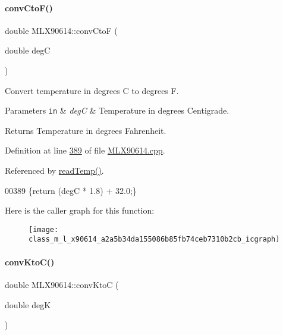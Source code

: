 \paragraph{\texorpdfstring{conv\+Cto\+F()}{convCtoF()}}
{\footnotesize\ttfamily double M\+L\+X90614\+::conv\+CtoF (\begin{DoxyParamCaption}\item[{double}]{degC }\end{DoxyParamCaption})}



Convert temperature in degrees C to degrees F. 


\begin{DoxyParams}[1]{Parameters}
\mbox{\tt in}  & {\em degC} & Temperature in degrees Centigrade. \\
\hline
\end{DoxyParams}
\begin{DoxyReturn}{Returns}
Temperature in degrees Fahrenheit. 
\end{DoxyReturn}


Definition at line \mbox{\hyperlink{_m_l_x90614_8cpp_source_l00389}{389}} of file \mbox{\hyperlink{_m_l_x90614_8cpp_source}{M\+L\+X90614.\+cpp}}.



Referenced by \mbox{\hyperlink{_m_l_x90614_8cpp_source_l00084}{read\+Temp()}}.


\begin{DoxyCode}
00389 \{\textcolor{keywordflow}{return} (degC * 1.8) + 32.0;\}
\end{DoxyCode}
Here is the caller graph for this function\+:\nopagebreak
\begin{figure}[H]
\begin{center}
\leavevmode
\texttt{[image: class\_m\_l\_x90614\_a2a5b34da155086b85fb74ceb7310b2cb\_icgraph]}
\end{center}
\end{figure}
\mbox{\label{class_m_l_x90614_af0a52019a3c66f0ae3b954a4e7475c88}} 
\paragraph{\texorpdfstring{conv\+Kto\+C()}{convKtoC()}}
{\footnotesize\ttfamily double M\+L\+X90614\+::conv\+KtoC (\begin{DoxyParamCaption}\item[{double}]{degK }\end{DoxyParamCaption})}



